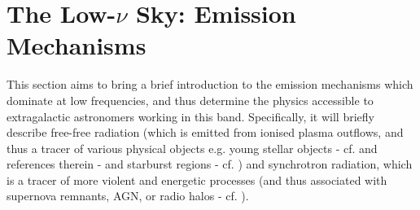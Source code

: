 
\section{The Low-$\nu$ Sky: Emission Mechanisms}
\pg
This section aims to bring a brief introduction to the emission mechanisms which dominate at low frequencies, and thus determine the physics accessible to extragalactic astronomers working in this band. Specifically, it will briefly describe
free-free radiation (which is emitted from ionised plasma outflows, and thus a tracer of various physical objects e.g. young stellar objects - cf. \citet{2017ApJ...834..206C} and references therein - and starburst regions - cf. \citet{2015A&A...574A.114V}) and synchrotron radiation, which is a tracer of more violent and energetic processes (and thus associated with supernova remnants, AGN, or radio halos - cf. \citet{2010A&A...509A..68C}).

